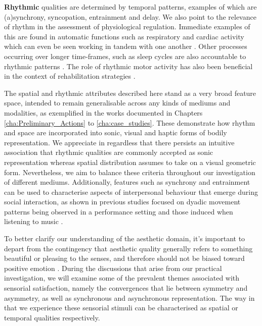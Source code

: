 \textbf{Rhythmic} qualities are determined by temporal patterns, examples of which are (a)synchrony, syncopation, entrainment and delay. We also point to the relevance of rhythm in the assessment of physiological regulation. Immediate examples of this are found in automatic functions such as respiratory and cardiac activity \cite{moser_phase_1995} which can even be seen working in tandem with one another \cite{scholkmann_pulse-respiration_2019}. Other processes occurring over longer time-frames, such as sleep cycles are also accountable to rhythmic patterns \cite{moser_why_2006}. The role of rhythmic motor activity has also been beneficial in the context of rehabilitation strategies \cite{fujii_role_2014}.

The spatial and rhythmic attributes described here stand as a very broad feature space, intended to remain generalisable across any kinds of mediums and modalities, as exemplified in the works documented in Chapters \ref{cha:Preliminary_Actions} to \ref{cha:case_studies}. These demonstrate how rhythm and space are incorporated into sonic, visual and haptic forms of bodily representation. We appreciate in regardless that there persists an intuitive association that rhythmic qualities are commonly accepted as sonic representation whereas spatial distribution assumes to take on a visual geometric form. Nevertheless, we aim to balance these criteria throughout our investigation of different mediums. Additionally, features such as synchrony and entrainment can be used to characterise aspects of interpersonal behaviour that emerge during social interaction, as shown in previous studies focused on dyadic movement patterns being observed in a performance setting \cite{ward_sensing_2018} and those induced when listening to music \cite{scurto_entrain_2019,danielsen_moving_2015}.

To better clarify our understanding of the aesthetic domain, it’s important to depart from the contingency that aesthetic quality generally refers to something beautiful or pleasing to the senses, and therefore should not be biased toward positive emotion \cite{fingerhut_aesthetic_2020}. During the discussions that arise from our practical investigation, 
we will examine some of the prevalent themes associated with sensorial satisfaction, namely the convergences that lie between symmetry and asymmetry, as well as synchronous and asynchronous representation. The way in that we experience these sensorial stimuli can be characterised as spatial or temporal qualities respectively.
